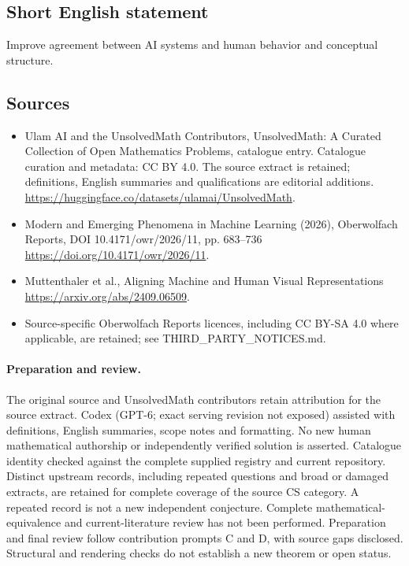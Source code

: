 \documentclass[11pt]{article}
\begin{document}
\subsection{Short English statement}
Improve agreement between AI systems and human behavior and conceptual structure.
\subsection{Sources}
\begin{itemize}
\item[\hypertarget{source:statement:1}{S1}] Ulam AI and the UnsolvedMath Contributors, UnsolvedMath: A Curated Collection of Open Mathematics Problems, catalogue entry. Catalogue curation and metadata: CC BY 4.0. The source extract is retained; definitions, English summaries and qualifications are editorial additions.
\url{https://huggingface.co/datasets/ulamai/UnsolvedMath}.
\item[\hypertarget{source:statement:2}{S2}] Modern and Emerging Phenomena in Machine Learning (2026), Oberwolfach Reports, DOI 10.4171/owr/2026/11, pp. 683--736
\url{https://doi.org/10.4171/owr/2026/11}.
\item[\hypertarget{source:statement:3}{S3}] Muttenthaler et al., Aligning Machine and Human Visual Representations
\url{https://arxiv.org/abs/2409.06509}.
\item Source-specific Oberwolfach Reports licences, including CC BY-SA 4.0 where applicable, are retained; see THIRD\_PARTY\_NOTICES.md.
\end{itemize}
\paragraph{Preparation and review.}
The original source and UnsolvedMath contributors retain attribution for the source extract. Codex (GPT-6; exact serving revision not exposed) assisted with definitions, English summaries, scope notes and formatting. No new human mathematical authorship or independently verified solution is asserted. Catalogue identity checked against the complete supplied registry and current repository. Distinct upstream records, including repeated questions and broad or damaged extracts, are retained for complete coverage of the source CS category. A repeated record is not a new independent conjecture. Complete mathematical-equivalence and current-literature review has not been performed. Preparation and final review follow contribution prompts C and D, with source gaps disclosed. Structural and rendering checks do not establish a new theorem or open status.
\label{end:statement}
\end{document}
